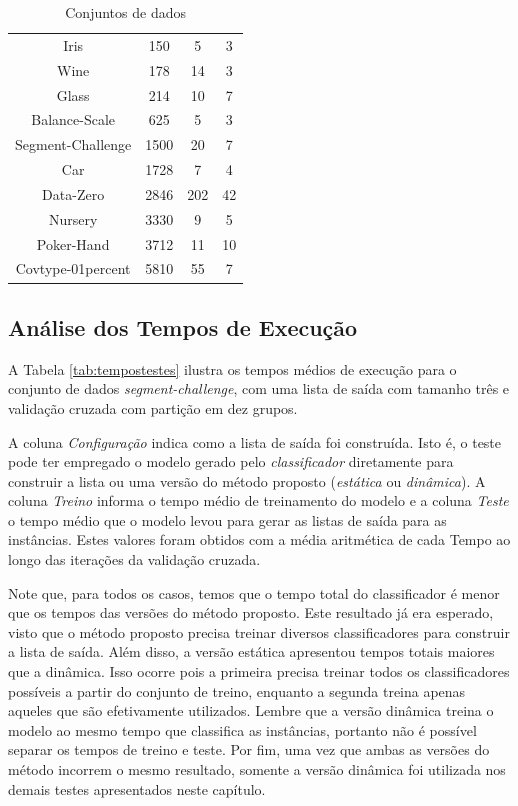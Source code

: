 {\begin{table}[h!]
\begin{center}
\begin{tabular}{cccc}
      Iris & 150 & 5 & 3 \\
      Wine & 178 & 14 & 3 \\ 
      Glass & 214 & 10 & 7 \\
      Balance-Scale & 625 & 5 & 3 \\
      Segment-Challenge & 1500 & 20 & 7 \\
      Car & 1728 & 7 & 4 \\
      Data-Zero & 2846 & 202 & 42 \\
      Nursery & 3330 & 9 & 5 \\
      Poker-Hand & 3712 & 11 & 10 \\      
      Covtype-01percent & 5810 & 55 & 7 \\

      \hline
    \end{tabular}
    \caption{Conjuntos de dados}
    \label{tab:datasets}
  \end{center}
\end{table}

\subsection{Análise dos Tempos de Execução}

A Tabela \ref{tab:tempostestes} ilustra os tempos médios de execução para o conjunto de dados \textit{segment-challenge}, com uma lista de saída com tamanho três e validação cruzada com partição em dez grupos.

A coluna \textit{Configuração} indica como a lista de saída foi construída.
Isto é, o teste pode ter empregado o modelo gerado pelo \textit{classificador} diretamente para construir a lista ou uma versão do método proposto (\textit{estática} ou \textit{dinâmica}).
A coluna \textit{Treino} informa o tempo médio de treinamento do modelo e a coluna \textit{Teste} o tempo médio que o modelo levou para gerar as listas de saída para as instâncias.
Estes valores foram obtidos com a média aritmética de cada Tempo ao longo das iterações da validação cruzada.

Note que, para todos os casos, temos que o tempo total do classificador é menor que os tempos das versões do método proposto.
Este resultado já era esperado, visto que o método proposto precisa treinar diversos classificadores para construir a lista de saída.
Além disso, a versão estática apresentou tempos totais maiores que a dinâmica.
Isso ocorre pois a primeira precisa treinar todos os classificadores possíveis a partir do conjunto de treino, enquanto a segunda treina apenas aqueles que são efetivamente utilizados.
Lembre que a versão dinâmica treina o modelo ao mesmo tempo que classifica as instâncias, portanto não é possível separar os tempos de treino e teste.
Por fim, uma vez que ambas as versões do método incorrem o mesmo resultado, somente a versão dinâmica foi utilizada nos demais testes apresentados neste capítulo.

}
